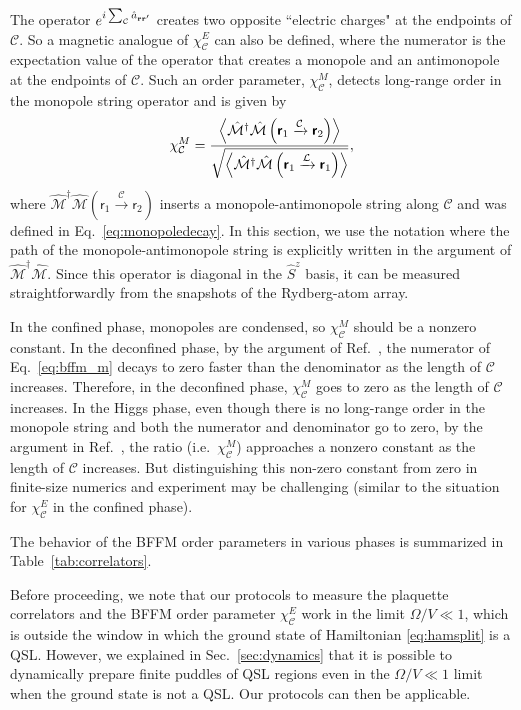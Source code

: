 \documentclass[twocolumn,superscriptaddress,amsmath,amssymb,aps,prx,nofootinbib]{revtex4-2}
\newcommand{\dual}[1]{\boldsymbol{\mathsf{#1}}}
\begin{document}
The operator $e^{i \sum_{\mathcal{C}} \hat{a}_{\vb{r} \vb{r}'}}$ creates two opposite ``electric charges" at the endpoints of $\mathcal{C}$. So a magnetic analogue of $\chi^E_\mathcal{C}$ can also be defined, where the  numerator is the expectation value of the operator that creates a monopole and an antimonopole at the endpoints of $\mathcal{C}$. Such an order parameter, $\chi_{\mathcal{C}}^M$, detects long-range order in the monopole string operator and is given by
\begin{equation}\label{eq:bffm_m}
  \chi_{\mathcal{C}}^M = \frac{\expval{ \hat{\mathcal{M}}^{\dagger} \hat{\mathcal{M}}\left(\dual{r}_1 \xrightarrow{\mathcal{C}} \dual{r}_2\right) } }{  \sqrt{\expval{ \hat{\mathcal{M}}^{\dagger} \hat{\mathcal{M}}\left(\dual{r}_1 \xrightarrow{\mathcal{L}} \dual{r}_1\right)}}  },
\end{equation}
where $\hat{\mathcal{M}}^\dagger \hat{\mathcal{M}} (\dual{r}_1 \xrightarrow{\mathcal{C}} \dual{r}_2)$ inserts a monopole-antimonopole string along $\mathcal{C}$ and was defined in Eq.~\eqref{eq:monopoledecay}. In this section, we use the notation where the path of the monopole-antimonopole string is explicitly written in the argument of $\hat{\mathcal{M}}^\dagger \hat{\mathcal{M}}$. 
Since this operator is diagonal in the $\hat{S}^z$ basis, it can be measured straightforwardly from the snapshots of the Rydberg-atom array.

In the confined phase, monopoles are condensed, so $\chi_{\mathcal{C}}^M$ should be a nonzero constant. In the deconfined phase, by the argument of Ref.~\cite{fredenhagen1986}, the numerator of Eq.~\eqref{eq:bffm_m} decays to zero faster than the denominator as the length of $\mathcal{C}$ increases. Therefore, in the deconfined phase, $\chi_{\mathcal{C}}^M$ goes to zero as the length of $\mathcal{C}$ increases. In the Higgs phase, even though there is no long-range order in the monopole string and both the numerator and denominator go to zero, by the argument in Ref.~\cite{fredenhagen1986}, the ratio (i.e.~$\chi_{\mathcal{C}}^M$) approaches a nonzero constant as the length of $\mathcal{C}$ increases. But distinguishing this non-zero constant from zero in finite-size numerics and experiment may be challenging (similar to the situation for $\chi_{\mathcal{C}}^E$ in the confined phase).

The behavior of the BFFM order parameters in various phases is summarized in Table~\ref{tab:correlators}.

Before proceeding, we note that our protocols to measure the plaquette correlators and the BFFM order parameter $\chi_\mathcal{C}^E$ work in the limit $\Omega/V \ll 1$, which is outside the window in which the ground state of Hamiltonian \eqref{eq:hamsplit} is a QSL. However, we explained in Sec.~\ref{sec:dynamics} that it is possible to dynamically prepare finite puddles of QSL regions even in the $\Omega /V \ll 1$ limit when the ground state is not a QSL. Our protocols can then be applicable. 
\end{document}
